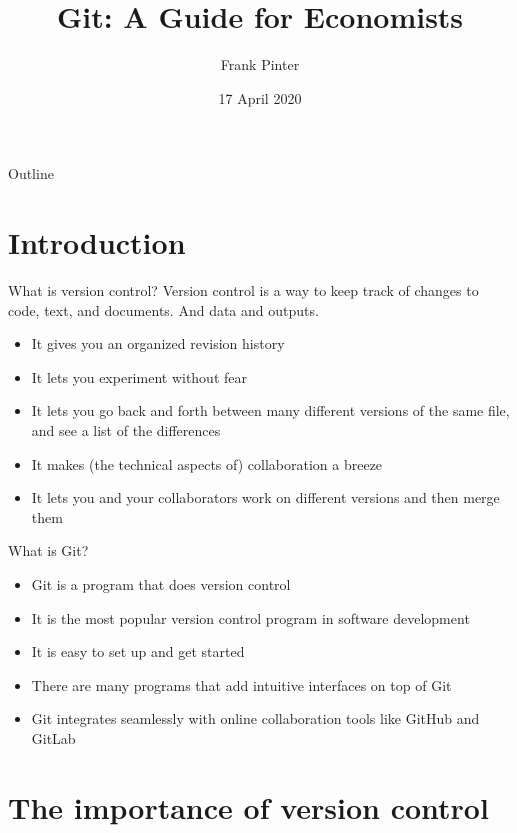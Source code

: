 \documentclass{beamer}
\title[Git for Economists]{Git: A Guide for Economists}
\author{Frank Pinter}
\date{17 April 2020}
\begin{document}
\begin{frame}
  \titlepage
\end{frame}

\begin{frame}{Outline}
  \tableofcontents
\end{frame}

\section*{Introduction}

\begin{frame}{What is version control?}
Version control is a way to keep track of changes to code, text, and documents. And data and outputs.
\begin{itemize}
\item It gives you an organized revision history
\item It lets you experiment without fear
\item It lets you go back and forth between many different versions of the same file, and see a list of the differences
\item It makes (the technical aspects of) collaboration a breeze
\item It lets you and your collaborators work on different versions and then merge them
\end{itemize}
\end{frame}

\begin{frame}{What is Git?}
\begin{itemize}
\item Git is a program that does version control
\item It is the most popular version control program in software development
\item It is easy to set up and get started
\item There are many programs that add intuitive interfaces on top of Git
\item Git integrates seamlessly with online collaboration tools like GitHub and GitLab
\end{itemize}
\end{frame}

\section{The importance of version control}
\end{document}
